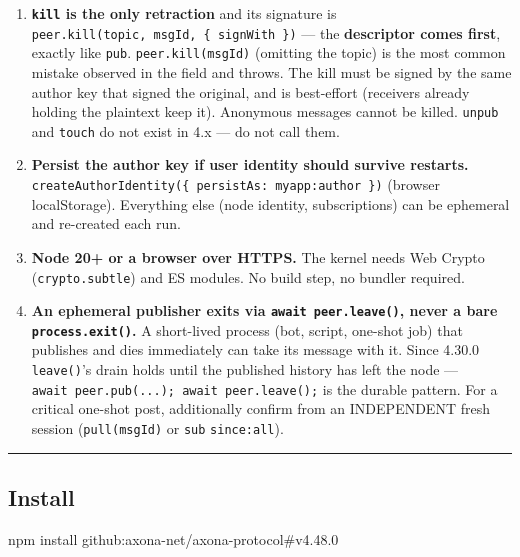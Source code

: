 \documentclass[
  nobib]{tufte-handout}
\newenvironment{Shaded}{}{}
\newcommand{\ExtensionTok}[1]{#1}
\newcommand{\NormalTok}[1]{#1}
\begin{document}
\begin{enumerate}
  ceiling). Re-publishing the identical payload from the same author
  yields the SAME msgId and refreshes the hold (an upsert; subscribers
  are not re-notified). Axona is a live messaging fabric, not permanent
  storage.
\item
  \textbf{\texttt{kill} is the only retraction} and its signature is
  \texttt{peer.kill(topic,\ msgId,\ \{\ signWith\ \})} --- the
  \textbf{descriptor comes first}, exactly like \texttt{pub}.
  \texttt{peer.kill(msgId)} (omitting the topic) is the most common
  mistake observed in the field and throws. The kill must be signed by
  the same author key that signed the original, and is best-effort
  (receivers already holding the plaintext keep it). Anonymous messages
  cannot be killed. \texttt{unpub} and \texttt{touch} do not exist in
  4.x --- do not call them.
\item
  \textbf{Persist the author key if user identity should survive
  restarts.}
  \texttt{createAuthorIdentity(\{\ persistAs:\ \textquotesingle{}myapp:author\textquotesingle{}\ \})}
  (browser localStorage). Everything else (node identity, subscriptions)
  can be ephemeral and re-created each run.
\item
  \textbf{Node 20+ or a browser over HTTPS.} The kernel needs Web Crypto
  (\texttt{crypto.subtle}) and ES modules. No build step, no bundler
  required.
\item
  \textbf{An ephemeral publisher exits via \texttt{await\ peer.leave()},
  never a bare \texttt{process.exit()}.} A short-lived process (bot,
  script, one-shot job) that publishes and dies immediately can take its
  message with it. Since 4.30.0 \texttt{leave()}'s drain holds until the
  published history has left the node ---
  \texttt{await\ peer.pub(...);\ await\ peer.leave();} is the durable
  pattern. For a critical one-shot post, additionally confirm from an
  INDEPENDENT fresh session (\texttt{pull(msgId)} or \texttt{sub}
  \texttt{since:\textquotesingle{}all\textquotesingle{}}).
\end{enumerate}

\begin{center}\rule{0.5\linewidth}{0.5pt}\end{center}

\subsection{Install}\label{install}

\begin{Shaded}
\begin{Highlighting}[]
\ExtensionTok{npm}\NormalTok{ install github:axona{-}net/axona{-}protocol\#v4.48.0}
\end{Highlighting}
\end{Shaded}
\end{document}

